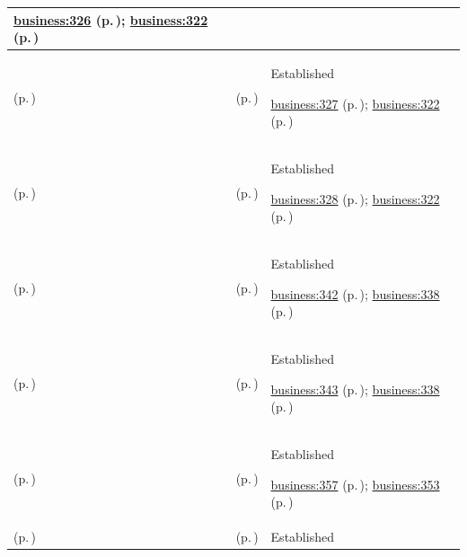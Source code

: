 \begin{longtable}{|>{\raggedright\arraybackslash}p{0.27\TableWidth}|>{\raggedright\arraybackslash}p{0.27\TableWidth}|>{\raggedright\arraybackslash}p{0.46\TableWidth}|}
 \hyperref[rad:business:324]{business:326} (p.\,\pageref{rad:business:324}); \hyperref[rad:business:322]{business:322} (p.\,\pageref{rad:business:322})\\\hline
\nameref{cap:bc-individual-health-assessment} (p.\,\pageref{cap:bc-individual-health-assessment}) & \nameref{cap:bc-clinical-examination} (p.\,\pageref{cap:bc-clinical-examination}) & Established

 \hyperref[rad:business:324]{business:327} (p.\,\pageref{rad:business:324}); \hyperref[rad:business:322]{business:322} (p.\,\pageref{rad:business:322})\\\hline
\nameref{cap:bc-individual-health-assessment} (p.\,\pageref{cap:bc-individual-health-assessment}) & \nameref{cap:bc-health-status-measurement} (p.\,\pageref{cap:bc-health-status-measurement}) & Established

 \hyperref[rad:business:324]{business:328} (p.\,\pageref{rad:business:324}); \hyperref[rad:business:322]{business:322} (p.\,\pageref{rad:business:322})\\\hline
\nameref{cap:bc-individual-health-monitoring} (p.\,\pageref{cap:bc-individual-health-monitoring}) & \nameref{cap:bc-health-state-monitoring} (p.\,\pageref{cap:bc-health-state-monitoring}) & Established

 \hyperref[rad:business:340]{business:342} (p.\,\pageref{rad:business:340}); \hyperref[rad:business:338]{business:338} (p.\,\pageref{rad:business:338})\\\hline
\nameref{cap:bc-individual-health-monitoring} (p.\,\pageref{cap:bc-individual-health-monitoring}) & \nameref{cap:bc-care-response-monitoring} (p.\,\pageref{cap:bc-care-response-monitoring}) & Established

 \hyperref[rad:business:340]{business:343} (p.\,\pageref{rad:business:340}); \hyperref[rad:business:338]{business:338} (p.\,\pageref{rad:business:338})\\\hline
\nameref{cap:bc-individual-care-review} (p.\,\pageref{cap:bc-individual-care-review}) & \nameref{cap:bc-care-appropriateness-review} (p.\,\pageref{cap:bc-care-appropriateness-review}) & Established

 \hyperref[rad:business:355]{business:357} (p.\,\pageref{rad:business:355}); \hyperref[rad:business:353]{business:353} (p.\,\pageref{rad:business:353})\\\hline
\nameref{cap:bc-individual-care-review} (p.\,\pageref{cap:bc-individual-care-review}) & \nameref{cap:bc-care-effectiveness-review} (p.\,\pageref{cap:bc-care-effectiveness-review}) & Established


\end{longtable}
